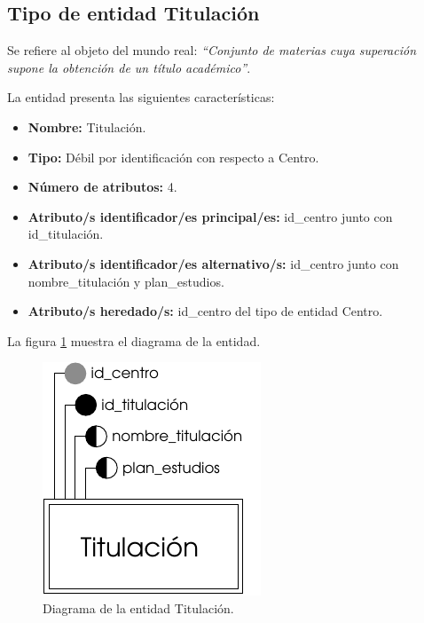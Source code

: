 \subsection{Tipo de entidad Titulación}

   \begin{description}

   \item[Definición] Se refiere al objeto del mundo real: \emph{``Conjunto de
        materias cuya superación supone la obtención de un título académico''}.

   \item[Características] La entidad presenta las siguientes características:
      \begin{itemize}
         \item \textbf{Nombre:} Titulación.
         \item \textbf{Tipo:} Débil por identificación con respecto a Centro.
         \item \textbf{Número de atributos:} 4.
         \item \textbf{Atributo/s identificador/es principal/es:} id\_centro junto con \\id\_titulación.
         \item \textbf{Atributo/s identificador/es alternativo/s:} id\_centro junto con nombre\_titulación y plan\_estudios.
         \item \textbf{Atributo/s heredado/s:} id\_centro del tipo de entidad Centro.
      \end{itemize}

   \item[Diagrama] La figura \ref{diagramaTitulacion} muestra el diagrama de la entidad.
   \item \begin{figure}[!ht]
            \begin{center}
            \includegraphics[]{07.Modelo_Entidad-Interrelacion/7.2.Analisis_Entidades/diagramas/titulacion.pdf}
            \caption{Diagrama de la entidad Titulación.}
            \label{diagramaTitulacion}
            \end{center}
         \end{figure}


\end{description}
